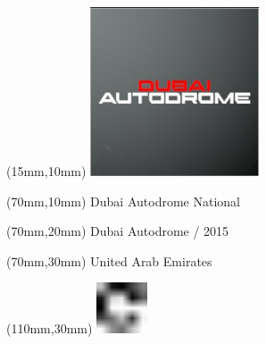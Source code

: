 \null\newpage
\begin{textblock*}{50mm}(15mm,10mm)%
\includegraphics[width=50mm]{LG/2015-05-20_00081.png}
\end{textblock*}
\begin{textblock*}{130mm}(70mm,10mm)%
{\fontsize{20}{20}\selectfont Dubai Autodrome National}\\
\end{textblock*}
\begin{textblock*}{120mm}(70mm,20mm)%
{\fontsize{16}{16}\selectfont Dubai Autodrome / 2015}\\
\end{textblock*}
\begin{textblock*}{120mm}(70mm,30mm)%
{\fontsize{12}{12}\selectfont United Arab Emirates}
\end{textblock*}
\begin{textblock*}{30mm}(110mm,30mm)%
\centering
\includegraphics[height=15mm]{icons/fa-rotate-right.pdf}
\end{textblock*}
